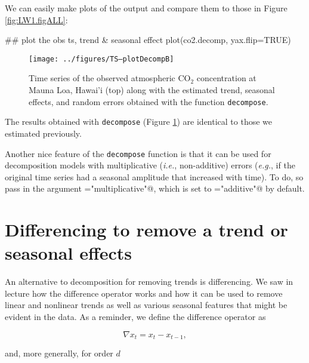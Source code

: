 We can easily make plots of the output and compare them to those in Figure \ref{fig:LW1.figALL}:

\begin{Schunk}
\begin{Sinput}
 ## plot the obs ts, trend & seasonal effect
 plot(co2.decomp, yax.flip=TRUE)
\end{Sinput}
\end{Schunk}

\begin{figure}[htp]
\begin{center}
\texttt{[image: ../figures/TS--plotDecompB]}
\end{center}
\caption{Time series of the observed atmospheric CO$_2$ concentration at Mauna Loa, Hawai'i (top) along with the estimated trend, seasonal effects, and random errors obtained with the function \texttt{decompose}.}
\label{fig:LW1.figDecomp}
\end{figure}

\noindent The results obtained with \texttt{decompose} (Figure \ref{fig:LW1.figDecomp}) are identical to those we estimated previously.

Another nice feature of the \texttt{decompose} function is that it can be used for decomposition models with multiplicative (\emph{i.e.}, non-additive) errors (\emph{e.g.}, if the original time series had a seasonal amplitude that increased with time).  To do, so pass in the argument \verb@type="multiplicative"@, which is set to \verb@type="additive"@ by default.

\section{Differencing to remove a trend or seasonal effects}

An alternative to decomposition for removing trends is differencing.  We saw in lecture how the difference operator works and how it can be used to remove linear and nonlinear trends as well as various seasonal features that might be evident in the data.  As a reminder, we define the difference operator as

\begin{equation}\label{eqn:diffDefnA}
\nabla x_t = x_t - x_{t-1},
\end{equation}

\noindent and, more generally, for order $d$

